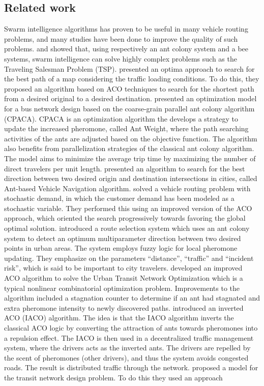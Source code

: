 \subsection{Related work}


Swarm intelligence algorithms has proven to be useful in many vehicle routing problems, and many studies have been done to improve the quality of such problems. \citet{dorigo97} and \citet{lucic03} showed that, using respectively an ant colony system and a bee systems, swarm intelligence can solve highly complex problems such as the Traveling Salesman Problem (TSP). \citet{hsiao04} presented an optima approach to search for the best path of a map considering the traffic loading conditions. To do this, they proposed an algorithm based on ACO techniques to search for the shortest path from a desired original to a desired destination. \citet{yang07} presented an optimization model for a bus network design based on the coarse-grain parallel ant colony algorithm (CPACA). CPACA is an optimization algorithm the develops a strategy to update the increased pheromone, called Ant Weight, where the path searching activities of the ants are adjusted based on the objective function. The algorithm also benefits from parallelization strategies of the classical ant colony algorithm. The model aims to minimize the average trip time by maximizing the number of direct travelers per unit length. \citet{salehi-nezhad07} presented an algorithm to search for the best direction between two desired origin and destination intersections in cities, called Ant-based Vehicle Navigation algorithm. \citet{tripathi09} solved a vehicle routing problem with stochastic demand, in which the customer demand has been modeled as a stochastic variable. They performed this using an improved version of the ACO approach, which oriented the search progressively towards favoring the global optimal solution. \citet{salehinejad10} introduced a route selection system which uses an ant colony system to detect an optimum multiparameter direction between two desired points in urban areas. The system employs fuzzy logic for local pheromone updating. They emphasize on the parameters ``distance'', ``traffic'' and ``incident risk'', which is said to be important to city travelers. \citet{jiang10} developed an improved ACO algorithm to solve the Urban Transit Network Optimization which is a typical nonlinear combinatorial optimization problem. Improvements to the algorithm included a stagnation counter to determine if an ant had stagnated and extra pheromone intensity to newly discovered paths. \citet{dias14} introduced an inverted ACO (IACO) algorithm. The idea is that the IACO algorithm inverts the classical ACO logic by converting the attraction of ants towards pheromones into a repulsion effect. The IACO is then used in a decentralized traffic management system, where the drivers acts as the inverted ants. The drivers are repelled by the scent of pheromones (other drivers), and thus the system avoids congested roads. The result is distributed traffic through the network. \citet{nikolic14} proposed a model for the transit network design problem. To do this they used an approach 